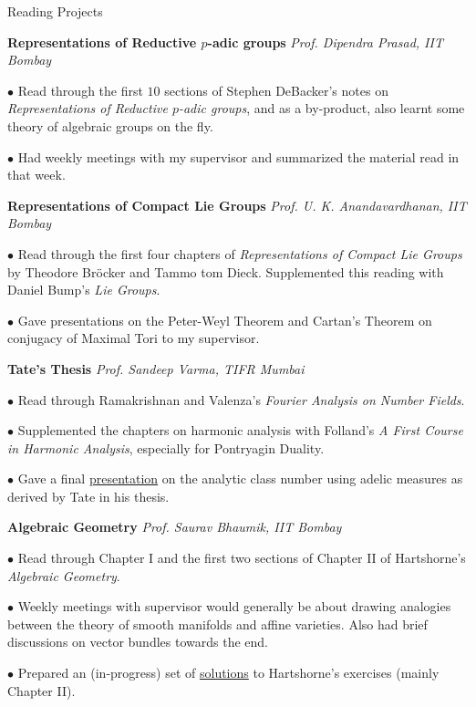 \begin{rubric}{Reading Projects}
	
	\entry*[2024\phantom{}] \textbf{Representations of Reductive $p$-adic groups} \hfill \emph{Prof. Dipendra Prasad, IIT Bombay}

	$\bullet$ Read through the first $10$ sections of Stephen DeBacker's notes on \emph{Representations of Reductive $p$-adic groups}, and as a by-product, also learnt some theory of algebraic groups on the fly.

	$\bullet$ Had weekly meetings with my supervisor and summarized the material read in that week.


	\entry*[2024\phantom{}] \textbf{Representations of Compact Lie Groups} \hfill \emph{Prof. U. K. Anandavardhanan, IIT Bombay}

	$\bullet$ Read through the first four chapters of \emph{Representations of Compact Lie Groups} by Theodore Br\"ocker and Tammo tom Dieck. Supplemented this reading with Daniel Bump's \emph{Lie Groups}.

	$\bullet$ Gave presentations on the Peter-Weyl Theorem and Cartan's Theorem on conjugacy of Maximal Tori to my supervisor.


	\entry*[2024\phantom{}] \textbf{Tate's Thesis} \hfill \emph{Prof. Sandeep Varma, TIFR Mumbai}

	$\bullet$ Read through Ramakrishnan and Valenza's \emph{Fourier Analysis on Number Fields}. 

	$\bullet$ Supplemented the chapters on harmonic analysis with Folland's \emph{A First Course in Harmonic Analysis}, especially for Pontryagin Duality.

	$\bullet$ Gave a final \href{link.com}{presentation} on the analytic class number using adelic measures as derived by Tate in his thesis.


	\entry*[2024\phantom{}] \textbf{Algebraic Geometry} \hfill \emph{Prof. Saurav Bhaumik, IIT Bombay}

	$\bullet$ Read through Chapter I and the first two sections of Chapter II of Hartshorne's \emph{Algebraic Geometry}.

	$\bullet$ Weekly meetings with supervisor would generally be about drawing analogies between the theory of smooth manifolds and affine varieties. Also had brief discussions on vector bundles towards the end.

	$\bullet$ Prepared an (in-progress) set of \href{link.com}{solutions} to Hartshorne's exercises (mainly Chapter II).



\end{rubric}
